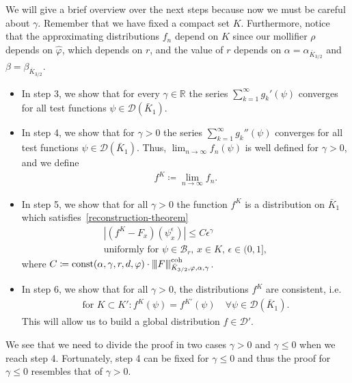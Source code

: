 We will give a brief overview over the next steps because now we must be careful about \(\gamma\). Remember that we have fixed a compact set \(K\). Furthermore, notice that the approximating distributions \(f_n\) depend on \(K\) since our mollifier \(\rho\) depends on \(\hat \varphi\), which depends on \(r\), and the value of \(r\) depends on \(\alpha = \alpha_{\bar K_{3/2}}\) and \(\beta = \beta_{\bar K_{3/2}}\).
\begin{itemize}
    \item In step 3, we show that for every \(\gamma \in \mathbb{R}\) the series \(\sum^{\infty}_{k=1} g_k'(\psi)\) converges for all test functions \(\psi \in \mathcal{D}(\bar K_1)\).
    \item In step 4, we show that for \(\gamma > 0\) the series \(\sum^{\infty}_{k=1} g_k''(\psi)\) converges for all test functions \(\psi \in \mathcal{D}(\bar K_1)\). Thus, \(\lim_{n \to \infty} f_n(\psi)\) is well defined for \(\gamma > 0\), and we define 
    \begin{align*}
        f^K \coloneqq \lim_{n \to \infty}f_n.
    \end{align*}
    \item In step 5, we show that for all \(\gamma > 0\) the function \(f^K\) is a distribution on \(\bar K_1\) which satisfies~\eqref{reconstruction-theorem}
    \begin{gather*}
        |(f^K - F_x)(\psi^\epsilon_x)| \leq C \epsilon^\gamma \\ 
        \text{uniformly for \(\psi \in \mathcal{B}_r\), \(x \in K\), \(\epsilon \in (0,1]\)},
    \end{gather*}
    where \(C \coloneqq \mathrm{const}(\alpha, \gamma, r, d, \varphi) \cdot {\left\vert\kern-0.25ex\left\vert\kern-0.25ex\left\vert F \right\vert\kern-0.25ex\right\vert\kern-0.25ex\right\vert}^{\mathrm{coh}}_{\bar K_{3/2}, \varphi, \alpha, \gamma}\).
    \item In step 6, we show that for all \(\gamma > 0\), the distributions \(f^K\) are consistent, i.e.
    \begin{align*}
        \text{for } K \subset K': f^{K}(\psi) = f^{K'}(\psi) \quad \forall \psi \in \mathcal{D}(\bar K_1).
    \end{align*}
    This will allow us to build a global distribution \(f \in \mathcal{D}'\).
\end{itemize}
We see that we need to divide the proof in two cases \(\gamma > 0\) and \(\gamma \leq 0\) when we reach step 4. Fortunately, step 4 can be fixed for \(\gamma \leq 0\) and thus the proof for \(\gamma \leq 0\) resembles that of \(\gamma > 0\).


